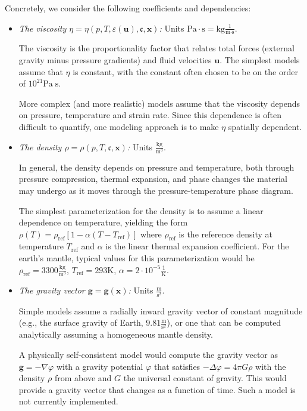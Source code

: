 \documentclass{article}
\begin{document}
Concretely, we consider the following coefficients and dependencies:
\begin{itemize}
\item \textit{The viscosity $\eta=\eta(p,T,\varepsilon(\mathbf u),\mathfrak
c,\mathbf x)$:} Units $\textrm{Pa}\cdot \textrm{s} =
  \textrm{kg}\frac{1}{\textrm{m}\cdot\textrm{s}}$.

  The viscosity is the proportionality factor that relates total forces
  (external gravity minus pressure gradients) and fluid velocities $\mathbf
  u$. The simplest models assume that $\eta$ is constant, with the constant
  often chosen to be on the order of $10^{21} \textrm{Pa}\;\textrm{s}$.

  More complex (and more realistic) models assume that the viscosity depends
  on pressure, temperature and strain rate. Since this dependence is often
  difficult to quantify, one modeling approach is to make $\eta$ spatially
  dependent.

\item \textit{The density $\rho=\rho(p,T,\mathfrak c,\mathbf x)$:} Units
  $\frac{\textrm{kg}}{\textrm{m}^3}$.

  In general, the density depends on pressure and temperature, both through
  pressure compression, thermal expansion, and phase changes the material may
  undergo as it moves through the pressure-temperature phase diagram.

  The simplest parameterization for the density is to assume a linear
  dependence on temperature, yielding the form
  $\rho(T)=\rho_{\text{ref}}[1-\alpha (T-T_{\text{ref}})]$ where
  $\rho_{\text{ref}}$ is the reference density at temperature $T_{\text{ref}}$
  and $\alpha$ is the linear thermal expansion coefficient. For the earth's
  mantle, typical values for this parameterization would be
  $\rho_{\text{ref}}=3300\frac{\textrm{kg}}{\textrm{m}^3}$,
  $T_{\text{ref}}=293 \textrm{K}$, $\alpha=2\cdot 10^{-5}
  \frac{1}{\mathrm{K}}$.

\item \textit{The gravity vector $\mathbf g=\mathbf g(\mathbf x)$:} Units
  $\frac{\textrm{m}}{\textrm{s}^2}$.

  Simple models assume a radially inward gravity vector of constant magnitude
  (e.g., the surface gravity of Earth, $9.81 \frac{\textrm{m}}{\textrm{s}^2}$),
  or one that can be computed analytically assuming a homogeneous mantle
  density.

  A physically self-consistent model would compute the gravity vector as
  $\mathbf g = -\nabla \varphi$ with a gravity potential $\varphi$ that
  satisfies $-\Delta\varphi=4\pi G\rho$ with the density $\rho$ from above and
  $G$ the universal constant of gravity. This would provide a gravity vector
  that changes as a function of time. Such a model is not currently
  implemented.


\end{itemize}
\end{document}
